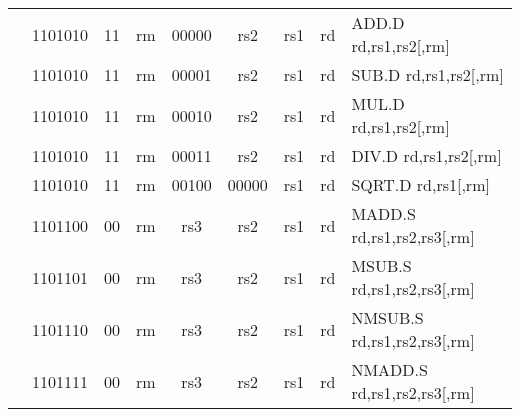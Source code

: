 \begin{table}[p]
\begin{small}
\begin{center}
\begin{tabular}{rcccccccccl}
&
\multicolumn{1}{|c|}{1101010} &
\multicolumn{1}{c|}{11} &
\multicolumn{2}{c|}{rm} &
\multicolumn{2}{c|}{00000} &
\multicolumn{1}{c|}{rs2} &
\multicolumn{1}{c|}{rs1} &
\multicolumn{1}{c|}{rd} & ADD.D rd,rs1,rs2[,rm] \\
\cline{2-10}
  

&
\multicolumn{1}{|c|}{1101010} &
\multicolumn{1}{c|}{11} &
\multicolumn{2}{c|}{rm} &
\multicolumn{2}{c|}{00001} &
\multicolumn{1}{c|}{rs2} &
\multicolumn{1}{c|}{rs1} &
\multicolumn{1}{c|}{rd} & SUB.D rd,rs1,rs2[,rm] \\
\cline{2-10}
  

&
\multicolumn{1}{|c|}{1101010} &
\multicolumn{1}{c|}{11} &
\multicolumn{2}{c|}{rm} &
\multicolumn{2}{c|}{00010} &
\multicolumn{1}{c|}{rs2} &
\multicolumn{1}{c|}{rs1} &
\multicolumn{1}{c|}{rd} & MUL.D rd,rs1,rs2[,rm] \\
\cline{2-10}
  

&
\multicolumn{1}{|c|}{1101010} &
\multicolumn{1}{c|}{11} &
\multicolumn{2}{c|}{rm} &
\multicolumn{2}{c|}{00011} &
\multicolumn{1}{c|}{rs2} &
\multicolumn{1}{c|}{rs1} &
\multicolumn{1}{c|}{rd} & DIV.D rd,rs1,rs2[,rm] \\
\cline{2-10}
  

&
\multicolumn{1}{|c|}{1101010} &
\multicolumn{1}{c|}{11} &
\multicolumn{2}{c|}{rm} &
\multicolumn{2}{c|}{00100} &
\multicolumn{1}{c|}{00000} &
\multicolumn{1}{c|}{rs1} &
\multicolumn{1}{c|}{rd} & SQRT.D rd,rs1[,rm] \\
\cline{2-10}
  

&
\multicolumn{1}{|c|}{1101100} &
\multicolumn{1}{c|}{00} &
\multicolumn{2}{c|}{rm} &
\multicolumn{2}{c|}{rs3} &
\multicolumn{1}{c|}{rs2} &
\multicolumn{1}{c|}{rs1} &
\multicolumn{1}{c|}{rd} & MADD.S rd,rs1,rs2,rs3[,rm] \\
\cline{2-10}
  

&
\multicolumn{1}{|c|}{1101101} &
\multicolumn{1}{c|}{00} &
\multicolumn{2}{c|}{rm} &
\multicolumn{2}{c|}{rs3} &
\multicolumn{1}{c|}{rs2} &
\multicolumn{1}{c|}{rs1} &
\multicolumn{1}{c|}{rd} & MSUB.S rd,rs1,rs2,rs3[,rm] \\
\cline{2-10}
  

&
\multicolumn{1}{|c|}{1101110} &
\multicolumn{1}{c|}{00} &
\multicolumn{2}{c|}{rm} &
\multicolumn{2}{c|}{rs3} &
\multicolumn{1}{c|}{rs2} &
\multicolumn{1}{c|}{rs1} &
\multicolumn{1}{c|}{rd} & NMSUB.S rd,rs1,rs2,rs3[,rm] \\
\cline{2-10}
  

&
\multicolumn{1}{|c|}{1101111} &
\multicolumn{1}{c|}{00} &
\multicolumn{2}{c|}{rm} &
\multicolumn{2}{c|}{rs3} &
\multicolumn{1}{c|}{rs2} &
\multicolumn{1}{c|}{rs1} &
\multicolumn{1}{c|}{rd} & NMADD.S rd,rs1,rs2,rs3[,rm] \\
\cline{2-10}
  


\end{tabular}
\end{center}
\end{small}
\end{table}

